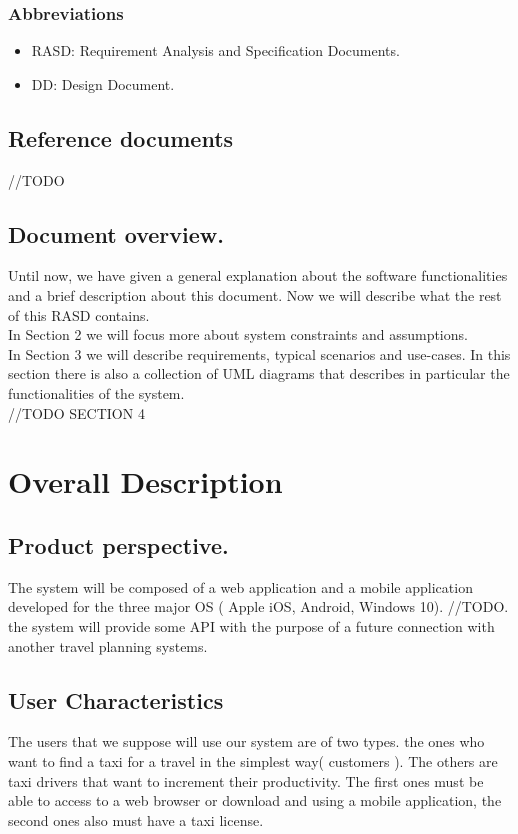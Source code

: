 \documentclass{report}
\begin{document}
		\subsection{Abbreviations}
		\begin{itemize}
			\item RASD: Requirement Analysis and Specification Documents.
			\item DD: Design Document.
		\end{itemize}
		
	\section{Reference documents}
	//TODO
		
	\section{Document overview.}
	Until now, we have given a general explanation about the software functionalities and a brief description about this document. Now we will describe what the rest of this RASD contains.\\
	In Section 2 we will focus more about system constraints and assumptions.\\
	In Section 3 we will describe requirements, typical scenarios and use-cases. In this section there is also a collection of UML diagrams that describes in particular the functionalities of the system.\\
	//TODO SECTION 4
		
\chapter{Overall Description}
	
	\section{Product perspective.}
	The system will be composed of a web application and a mobile application developed for the three major OS ( Apple iOS, Android, Windows 10). //TODO. the system will provide some API with the purpose of a future connection with another travel planning systems. 
		
	\section{User Characteristics }
	The users that we suppose will use our system are of two types. the ones who want to find a taxi for a travel in the simplest way( customers ). The others are taxi drivers that want to increment their productivity. The first ones must be able to access to a web browser or download and using a mobile application, the second ones also must have a taxi license.
		
\end{document}
